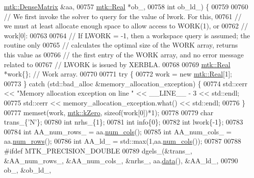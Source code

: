 \begin{DoxyCode}
      \hyperlink{classmtk_1_1DenseMatrix}{mtk::DenseMatrix} &aa,
00757                                                    \hyperlink{group__c01-roots_gac080bbbf5cbb5502c9f00405f894857d}{mtk::Real} *ob\_,
00758                                                    \textcolor{keywordtype}{int} ob\_ld\_) \{
00759 
00760   \textcolor{comment}{// We first invoke the solver to query for the value of lwork. For this,}
00761   \textcolor{comment}{// we must at least allocate enough space to allow access to WORK(1), or}
00762   \textcolor{comment}{// work[0]:}
00763 
00764   \textcolor{comment}{// If LWORK = -1, then a workspace query is assumed; the routine only}
00765   \textcolor{comment}{// calculates the optimal size of the WORK array, returns this value as}
00766   \textcolor{comment}{// the first entry of the WORK array, and no error message related to}
00767   \textcolor{comment}{// LWORK is issued by XERBLA.}
00768 
00769   \hyperlink{group__c01-roots_gac080bbbf5cbb5502c9f00405f894857d}{mtk::Real} *work\{\}; \textcolor{comment}{// Work array.}
00770 
00771   \textcolor{keywordflow}{try} \{
00772     work = \textcolor{keyword}{new} \hyperlink{group__c01-roots_gac080bbbf5cbb5502c9f00405f894857d}{mtk::Real}[1];
00773   \} \textcolor{keywordflow}{catch} (std::bad\_alloc &memory\_allocation\_exception) \{
00774     std::cerr << \textcolor{stringliteral}{"Memory allocation exception on line "} << \_\_LINE\_\_ - 3 << std::endl;
00775     std::cerr << memory\_allocation\_exception.what() << std::endl;
00776   \}
00777   memset(work, \hyperlink{group__c01-roots_ga59a451a5fae30d59649bcda274fea271}{mtk::kZero}, \textcolor{keyword}{sizeof}(work[0])*1);
00778 
00779   \textcolor{keywordtype}{char} trans\_\{\textcolor{charliteral}{'N'}\};
00780   \textcolor{keywordtype}{int} nrhs\_\{1\};
00781   \textcolor{keywordtype}{int} info\{0\};
00782   \textcolor{keywordtype}{int} lwork\{-1\};
00783 
00784   \textcolor{keywordtype}{int} AA\_num\_rows\_  = aa.\hyperlink{classmtk_1_1DenseMatrix_a41747502d468c6728a4be31501b16e0e}{num\_cols}();
00785   \textcolor{keywordtype}{int} AA\_num\_cols\_  = aa.\hyperlink{classmtk_1_1DenseMatrix_a53f3afb3b6a8d21854458aaa9663cc74}{num\_rows}();
00786   \textcolor{keywordtype}{int} AA\_ld\_ = std::max(1,aa.\hyperlink{classmtk_1_1DenseMatrix_a41747502d468c6728a4be31501b16e0e}{num\_cols}());
00787 
00788 \textcolor{preprocessor}{  #ifdef MTK\_PRECISION\_DOUBLE}
00789   dgels\_(&trans\_, &AA\_num\_rows\_, &AA\_num\_cols\_, &nrhs\_, aa.\hyperlink{classmtk_1_1DenseMatrix_a0c33b8a9e01d157c61ddbdf807c25d84}{data}(), &AA\_ld\_,
00790          ob\_, &ob\_ld\_,

\end{DoxyCode}
